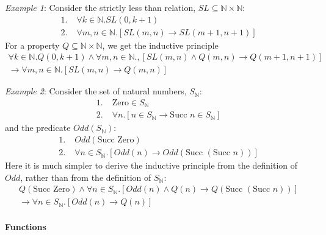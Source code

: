 \documentclass[10pt,twoside,twocolumn]{article}
\begin{document}
\emph{Example 1}: Consider the strictly less than relation, $SL\subseteq\mathbb{N}\times\mathbb{N}$:
\begin{align*}
1.\; & \forall k\in\mathbb{N}.SL\left(0,k+1\right)\\
2.\; & \forall m,n\in\mathbb{N}.\left[SL\left(m,n\right)\rightarrow SL\left(m+1,n+1\right)\right]
\end{align*}
For a property $Q\subseteq\mathbb{N}\times\mathbb{N}$, we get the
inductive principle
\begin{multline*}
\forall k\in\mathbb{N}.Q\left(0,k+1\right)\land\forall m,n\in\mathbb{N}.,\left[SL\left(m,n\right)\land Q\left(m,n\right)\rightarrow Q\left(m+1,n+1\right)\right]\\
\rightarrow\forall m,n\in\mathbb{N}.\left[SL\left(m,n\right)\rightarrow Q\left(m,n\right)\right]
\end{multline*}


\emph{Example 2}: Consider the set of natural numbers, $S_{\mathbb{N}}$:
\begin{align*}
1.\; & \mbox{Zero}\in S_{\mathbb{N}}\\
2.\; & \forall n.\left[n\in S_{\mathbb{N}}\rightarrow\mbox{Succ }n\in S_{\mathbb{N}}\right]
\end{align*}
and the predicate $Odd\left(S_{\mathbb{N}}\right)$:
\begin{align*}
1.\; & Odd\left(\mbox{Succ Zero}\right)\\
2.\; & \forall n\in S_{\mathbb{N}}.\left[Odd\left(n\right)\rightarrow Odd\left(\mbox{Succ }\left(\mbox{Succ }n\right)\right)\right]
\end{align*}
Here it is much simpler to derive the inductive principle from the
definition of $Odd$, rather than from the definition of $S_{\mathbb{N}}$:
\begin{multline*}
Q\left(\mbox{Succ Zero}\right)\land\forall n\in S_{\mathbb{N}}.\left[Odd\left(n\right)\land Q\left(n\right)\rightarrow Q\left(\mbox{Succ }\left(\mbox{Succ }n\right)\right)\right]\\
\rightarrow\forall n\in S_{\mathbb{N}}.\left[Odd\left(n\right)\rightarrow Q\left(n\right)\right]
\end{multline*}



\paragraph{Functions}
\end{document}
